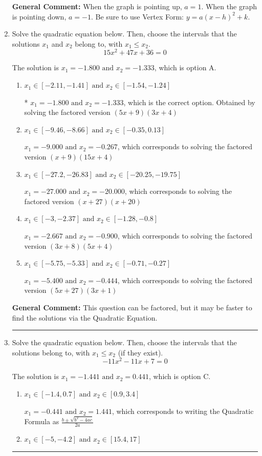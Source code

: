 \documentclass{extbook}[14pt]
\newcommand{\litem}[1]{\item #1

\rule{\textwidth}{0.4pt}}
\begin{document}
\begin{enumerate}
{\textbf{General Comment:} When the graph is pointing up, $a=1$. When the graph is pointing down, $a=-1$. Be sure to use Vertex Form: $y = a(x-h)^2+k$.
}
\litem{
Solve the quadratic equation below. Then, choose the intervals that the solutions $x_1$ and $x_2$ belong to, with $x_1 \leq x_2$.
\[ 15x^{2} +47 x + 36 = 0 \]

The solution is \( x_1 = -1.800 \text{ and } x_2 = -1.333 \), which is option A.\begin{enumerate}[label=\Alph*.]
\item \( x_1 \in [-2.11, -1.41] \text{ and } x_2 \in [-1.54, -1.24] \)

* $x_1 = -1.800 \text{ and } x_2 = -1.333$, which is the correct option. Obtained by solving the factored version $(5x + 9)(3x + 4)$
\item \( x_1 \in [-9.46, -8.66] \text{ and } x_2 \in [-0.35, 0.13] \)

$x_1 = -9.000 \text{ and } x_2 = -0.267$, which corresponds to solving the factored version $(x + 9)(15x + 4)$
\item \( x_1 \in [-27.2, -26.83] \text{ and } x_2 \in [-20.25, -19.75] \)

$x_1 = -27.000 \text{ and } x_2 = -20.000$, which corresponds to solving the factored version $(x + 27)(x + 20)$
\item \( x_1 \in [-3, -2.37] \text{ and } x_2 \in [-1.28, -0.8] \)

$x_1 = -2.667 \text{ and } x_2 = -0.900$, which corresponds to solving the factored version $(3x + 8)(5x + 4)$
\item \( x_1 \in [-5.75, -5.33] \text{ and } x_2 \in [-0.71, -0.27] \)

$x_1 = -5.400 \text{ and } x_2 = -0.444$, which corresponds to solving the factored version $(5x + 27)(3x + 1)$
\end{enumerate}

\textbf{General Comment:} This question can be factored, but it may be faster to find the solutions via the Quadratic Equation.
}
\litem{
Solve the quadratic equation below. Then, choose the intervals that the solutions belong to, with $x_1 \leq x_2$ (if they exist).
\[ -11x^{2} -11 x + 7 = 0 \]

The solution is \( x_1 = -1.441 \text{ and } x_2 = 0.441 \), which is option C.\begin{enumerate}[label=\Alph*.]
\item \( x_1 \in [-1.4, 0.7] \text{ and } x_2 \in [0.9, 3.4] \)

 $x_1 = -0.441 \text{ and } x_2 = 1.441$, which corresponds to writing the Quadratic Formula as $\frac{b \pm \sqrt{b^2 - 4ac}}{2a}$
\item \( x_1 \in [-5, -4.2] \text{ and } x_2 \in [15.4, 17] \)


\end{enumerate}}
\end{enumerate}
\end{document}
